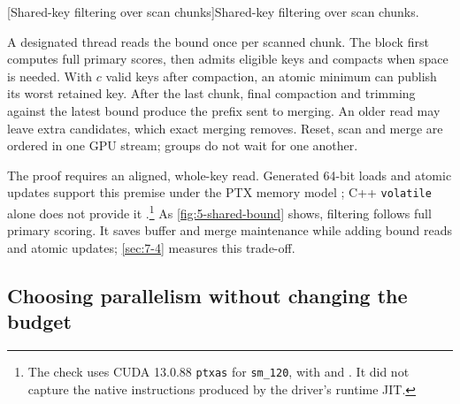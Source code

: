 \par\medskip\noindent\begin{minipage}{\linewidth}
\captionsetup{hypcap=false}
\centering

[Shared-key filtering over scan chunks]{Shared-key filtering over scan chunks.}
\label{fig:5-shared-bound}
\end{minipage}\par\medskip
A designated thread reads the bound once per scanned chunk. The block
first computes full primary scores, then admits eligible keys and
compacts when space is needed. With $c$ valid keys after compaction,
an atomic minimum can publish its worst retained key. After the last
chunk, final compaction and trimming against the latest bound produce
the prefix sent to merging. An older read may leave extra candidates,
which exact merging removes. Reset, scan and merge are ordered in one
GPU stream; groups do not wait for one another.

The proof requires an aligned, whole-key read. Generated 64-bit loads
and atomic updates support this premise under the PTX memory model
\cite{ptx_isa}; C++ \texttt{volatile} alone does not provide it
\cite{cuda_programming_guide}.\footnote{The check uses CUDA 13.0.88
\texttt{ptxas} for \texttt{sm\_120}, with
 and . It did not
capture the native instructions produced by the driver's runtime JIT.}
As \cref{fig:5-shared-bound} shows, filtering follows full primary
scoring. It saves buffer and merge maintenance while adding bound reads
and atomic updates; \cref{sec:7-4} measures this trade-off.

\subsection{Choosing parallelism without changing the budget}

